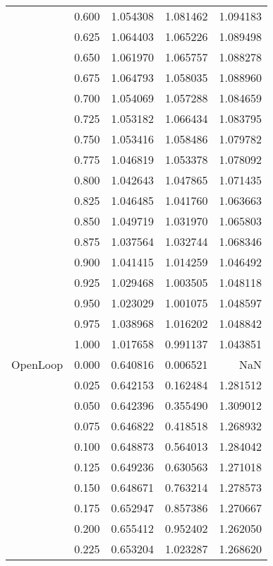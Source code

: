 \begin{tabular}{llrrr}
         & 0.600 &   1.054308 &   1.081462 &   1.094183 \\
         & 0.625 &   1.064403 &   1.065226 &   1.089498 \\
         & 0.650 &   1.061970 &   1.065757 &   1.088278 \\
         & 0.675 &   1.064793 &   1.058035 &   1.088960 \\
         & 0.700 &   1.054069 &   1.057288 &   1.084659 \\
         & 0.725 &   1.053182 &   1.066434 &   1.083795 \\
         & 0.750 &   1.053416 &   1.058486 &   1.079782 \\
         & 0.775 &   1.046819 &   1.053378 &   1.078092 \\
         & 0.800 &   1.042643 &   1.047865 &   1.071435 \\
         & 0.825 &   1.046485 &   1.041760 &   1.063663 \\
         & 0.850 &   1.049719 &   1.031970 &   1.065803 \\
         & 0.875 &   1.037564 &   1.032744 &   1.068346 \\
         & 0.900 &   1.041415 &   1.014259 &   1.046492 \\
         & 0.925 &   1.029468 &   1.003505 &   1.048118 \\
         & 0.950 &   1.023029 &   1.001075 &   1.048597 \\
         & 0.975 &   1.038968 &   1.016202 &   1.048842 \\
         & 1.000 &   1.017658 &   0.991137 &   1.043851 \\
OpenLoop & 0.000 &   0.640816 &   0.006521 &        NaN \\
         & 0.025 &   0.642153 &   0.162484 &   1.281512 \\
         & 0.050 &   0.642396 &   0.355490 &   1.309012 \\
         & 0.075 &   0.646822 &   0.418518 &   1.268932 \\
         & 0.100 &   0.648873 &   0.564013 &   1.284042 \\
         & 0.125 &   0.649236 &   0.630563 &   1.271018 \\
         & 0.150 &   0.648671 &   0.763214 &   1.278573 \\
         & 0.175 &   0.652947 &   0.857386 &   1.270667 \\
         & 0.200 &   0.655412 &   0.952402 &   1.262050 \\
         & 0.225 &   0.653204 &   1.023287 &   1.268620 \\

\end{tabular}
